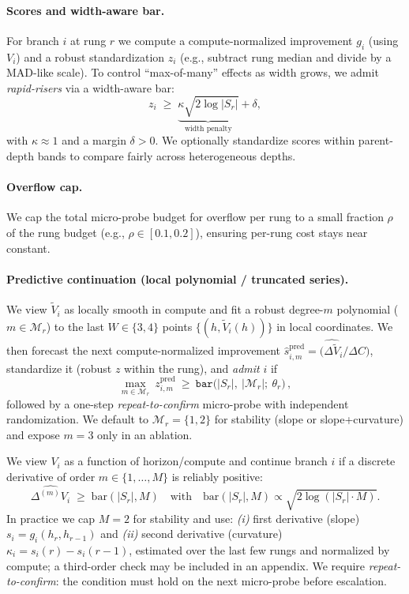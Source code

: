 \documentclass{article}
\begin{document}
\paragraph{Scores and width-aware bar.}
For branch $i$ at rung $r$ we compute a compute-normalized improvement $g_i$ (using $V_i$) and a robust standardization $z_i$ (e.g., subtract rung median and divide by a MAD-like scale).
To control ``max-of-many'' effects as width grows, we admit \emph{rapid-risers} via a width-aware bar:
\[
z_i \;\ge\; \underbrace{\kappa \sqrt{2\log |S_r|}}_{\text{width penalty}} + \delta,
\]
with $\kappa\approx 1$ and a margin $\delta>0$.
We optionally standardize scores within parent-depth bands to compare fairly across heterogeneous depths.

\paragraph{Overflow cap.}
We cap the total micro-probe budget for overflow per rung to a small fraction $\rho$ of the rung budget (e.g., $\rho\in[0.1,0.2]$), ensuring per-rung cost stays near constant.


\paragraph{Predictive continuation (local polynomial / truncated series).}
We view $\tilde V_i$ as locally smooth in compute and fit a robust degree-$m$ polynomial ($m\!\in\!\mathcal{M}_r$)
to the last $W\in\{3,4\}$ points $\{(h,\tilde V_i(h))\}$ in local coordinates.
We then forecast the next compute-normalized improvement
$\widehat{s}^{\mathrm{pred}}_{i,m}=\big(\widehat{\Delta \tilde V}_i / \Delta C\big)$,
standardize it (robust $z$ within the rung), and \emph{admit} $i$ if
\begin{equation}
\max_{m\in\mathcal{M}_r}\ z^{\mathrm{pred}}_{i,m}\ \ge\ \texttt{bar}\!\big(|S_r|,\ |\mathcal{M}_r|;\ \theta_r\big)\,,
\end{equation}
followed by a one-step \emph{repeat-to-confirm} micro-probe with independent randomization.
We default to $\mathcal{M}_r{=}\{1,2\}$ for stability (slope or slope+curvature) and expose $m{=}3$ only in an ablation.

We view $V_i$ as a function of horizon/compute and continue branch $i$ if a discrete derivative of order $m\in\{1,\dots,M\}$ is reliably positive:
\[
\widehat{\Delta^{(m)} V_i} \;\ge\; \text{bar}(|S_r|,M) \quad\text{with}\quad \text{bar}(|S_r|,M)\propto \sqrt{2\log(|S_r|\cdot M)}.
\]
In practice we cap $M=2$ for stability and use:
\emph{(i)} first derivative (slope) $s_i = g_i(h_r,h_{r-1})$ and
\emph{(ii)} second derivative (curvature) $\kappa_i = s_i(r)-s_i(r-1)$,
estimated over the last few rungs and normalized by compute; a third-order check may be included in an appendix.
We require \emph{repeat-to-confirm}: the condition must hold on the next micro-probe before escalation.
\end{document}
